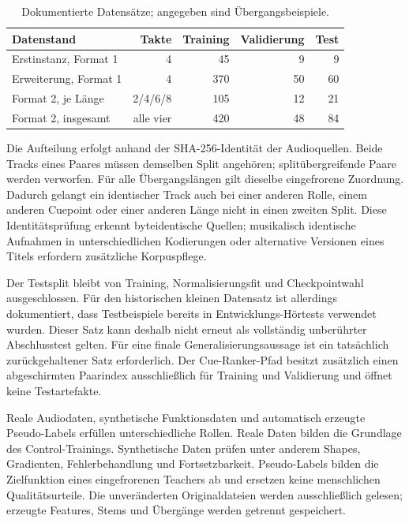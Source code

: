 \begin{table}[htbp]
  \centering
  \caption{Dokumentierte Datensätze; angegeben sind Übergangsbeispiele.}
  \label{tab:methodik-datasets}
  \begin{tabular}{lrrrr}
    \toprule
    Datenstand & Takte & Training & Validierung & Test \\
    \midrule
    Erstinstanz, Format 1 & 4 & 45 & 9 & 9 \\
    Erweiterung, Format 1 & 4 & 370 & 50 & 60 \\
    Format 2, je Länge & 2/4/6/8 & 105 & 12 & 21 \\
    Format 2, insgesamt & alle vier & 420 & 48 & 84 \\
    \bottomrule
  \end{tabular}
\end{table}

Die Aufteilung erfolgt anhand der SHA-256-Identität der Audioquellen. Beide Tracks eines Paares müssen demselben Split angehören; splitübergreifende Paare werden verworfen. Für alle Übergangslängen gilt dieselbe eingefrorene Zuordnung. Dadurch gelangt ein identischer Track auch bei einer anderen Rolle, einem anderen Cuepoint oder einer anderen Länge nicht in einen zweiten Split. Diese Identitätsprüfung erkennt byteidentische Quellen; musikalisch identische Aufnahmen in unterschiedlichen Kodierungen oder alternative Versionen eines Titels erfordern zusätzliche Korpuspflege.

Der Testsplit bleibt von Training, Normalisierungsfit und Checkpointwahl ausgeschlossen. Für den historischen kleinen Datensatz ist allerdings dokumentiert, dass Testbeispiele bereits in Entwicklungs-Hörtests verwendet wurden. Dieser Satz kann deshalb nicht erneut als vollständig unberührter Abschlusstest gelten. Für eine finale Generalisierungsaussage ist ein tatsächlich zurückgehaltener Satz erforderlich. Der Cue-Ranker-Pfad besitzt zusätzlich einen abgeschirmten Paarindex ausschließlich für Training und Validierung und öffnet keine Testartefakte.

Reale Audiodaten, synthetische Funktionsdaten und automatisch erzeugte Pseudo-Labels erfüllen unterschiedliche Rollen. Reale Daten bilden die Grundlage des Control-Trainings. Synthetische Daten prüfen unter anderem Shapes, Gradienten, Fehlerbehandlung und Fortsetzbarkeit. Pseudo-Labels bilden die Zielfunktion eines eingefrorenen Teachers ab und ersetzen keine menschlichen Qualitätsurteile. Die unveränderten Originaldateien werden ausschließlich gelesen; erzeugte Features, Stems und Übergänge werden getrennt gespeichert.

